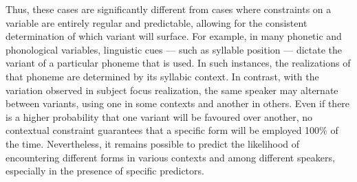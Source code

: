 Thus, these cases are significantly different from cases where constraints on a variable are entirely regular and predictable, allowing for the consistent determination of which variant will surface. For example, in many phonetic and phonological variables, linguistic cues — such as syllable position — dictate the variant of a particular phoneme that is used. In such instances, the realizations of that phoneme are determined by its syllabic context. In contrast, with the variation observed in subject focus realization, the same speaker may alternate between variants, using one in some contexts and another in others. Even if there is a higher probability that one variant will be favoured over another, no contextual constraint guarantees that a specific form will be employed 100\% of the time. Nevertheless, it remains possible to predict the likelihood of encountering different forms in various contexts and among different speakers, especially in the presence of specific predictors. 

